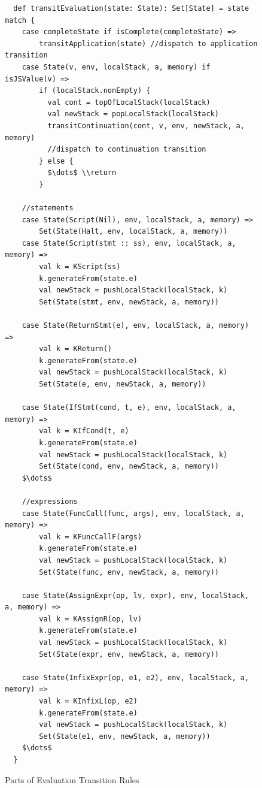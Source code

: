 \documentclass{article}
\begin{document}
\begin{figure}
\lstset{language=Scala, mathescape}
\begin{lstlisting}
  def transitEvaluation(state: State): Set[State] = state match {
    case completeState if isComplete(completeState) =>
        transitApplication(state) //dispatch to application transition
    case State(v, env, localStack, a, memory) if isJSValue(v) =>
        if (localStack.nonEmpty) {
          val cont = topOfLocalStack(localStack)
          val newStack = popLocalStack(localStack)
          transitContinuation(cont, v, env, newStack, a, memory)
          //dispatch to continuation transition
        } else {
          $\dots$ \\return
        }

    //statements
    case State(Script(Nil), env, localStack, a, memory) =>
        Set(State(Halt, env, localStack, a, memory))
    case State(Script(stmt :: ss), env, localStack, a, memory) =>
        val k = KScript(ss)
        k.generateFrom(state.e)
        val newStack = pushLocalStack(localStack, k)
        Set(State(stmt, env, newStack, a, memory))

    case State(ReturnStmt(e), env, localStack, a, memory) =>
        val k = KReturn()
        k.generateFrom(state.e)
        val newStack = pushLocalStack(localStack, k)
        Set(State(e, env, newStack, a, memory))

    case State(IfStmt(cond, t, e), env, localStack, a, memory) =>
        val k = KIfCond(t, e)
        k.generateFrom(state.e)
        val newStack = pushLocalStack(localStack, k)
        Set(State(cond, env, newStack, a, memory))
    $\dots$

    //expressions
    case State(FuncCall(func, args), env, localStack, a, memory) =>
        val k = KFuncCallF(args)
        k.generateFrom(state.e)
        val newStack = pushLocalStack(localStack, k)
        Set(State(func, env, newStack, a, memory))

    case State(AssignExpr(op, lv, expr), env, localStack, a, memory) =>
        val k = KAssignR(op, lv)
        k.generateFrom(state.e)
        val newStack = pushLocalStack(localStack, k)
        Set(State(expr, env, newStack, a, memory))

    case State(InfixExpr(op, e1, e2), env, localStack, a, memory) =>
        val k = KInfixL(op, e2)
        k.generateFrom(state.e)
        val newStack = pushLocalStack(localStack, k)
        Set(State(e1, env, newStack, a, memory))
    $\dots$
  }
\end{lstlisting}
\caption{Parts of Evaluation Transition Rules}
\label{fig:eval}
\end{figure}
\end{document}
